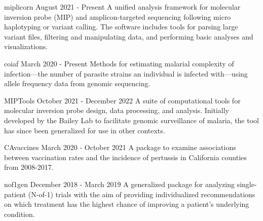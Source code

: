 
\begin{cvprojects}

  \cvproject
  {miplicorn} %
  {August 2021 - Present} %
  {
    A unified analysis framework for molecular inversion probe (MIP) and
    amplicon-targeted sequencing following micro haplotyping or variant
    calling. The software includes tools for parsing large variant files,
    filtering and manipulating data, and performing basic analyses and
    visualizations.
  }

  \cvproject
  {coiaf} %
  {March 2020 - Present} %
  {
    Methods for estimating malarial complexity of infection—the number of
    parasite strains an individual is infected with—using allele frequency data
    from genomic sequencing.
  } %

  \cvproject
  {MIPTools}
  {October 2021 - December 2022}
  {
    A suite of computational tools for molecular inversion probe design, data
    processing, and analysis. Initially developed by the Bailey Lab to
    facilitate genomic surveillance of malaria, the tool has since been
    generalized for use in other contexts.
  }

  \cvproject
  {CAvaccines}
  {March 2020 - October 2021}
  {
    A package to examine associations between vaccination rates and the
    incidence of pertussis in California counties from 2008-2017.
  }

  \cvproject
  {nof1gen}
  {December 2018 - March 2019}
  {
    A generalized package for analyzing single-patient (N-of-1) trials with the
    aim of providing individualized recommendations on which treatment has the
    highest chance of improving a patient's underlying condition.
  }

\end{cvprojects}
